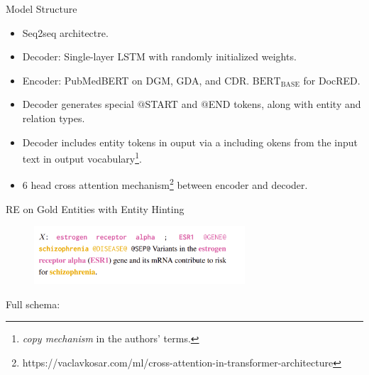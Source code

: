 \documentclass[usenames,dvipsnames,pdf]{beamer}
\begin{document}
        
        \begin{frame}{Model Structure}
          \begin{itemize}
          \item
            Seq2seq architectre.
          \item
            Decoder: Single-layer LSTM with randomly initialized weights.
          \item
            Encoder: PubMedBERT on DGM, GDA, and CDR.  $\text{BERT}_{\text{BASE}}$ for DocRED.
          \item
            Decoder generates special $@$START and $@$END tokens, along with entity and relation types.
          \item
            Decoder includes entity tokens in ouput via a including okens from the input text in output vocabulary\footnote{\textit{copy mechanism} in the authors' terms.}.
          \item
            6 head cross attention mechanism\footnote{https://vaclavkosar.com/ml/cross-attention-in-transformer-architecture} between encoder and decoder.
          \end{itemize}
        \end{frame}

        \begin{frame}{RE on Gold Entities with Entity Hinting}
          \begin{figure}
            \includegraphics[width=0.7\textwidth,height=0.7\textheight,keepaspectratio]{entity_hint} 
          \end{figure}

          Full schema:

          \begin{adjustbox}{varwidth=\linewidth}%
            \small{}

            
            \small{}
            

            \small{}
          \end{adjustbox}
        \end{frame}
\end{document}
